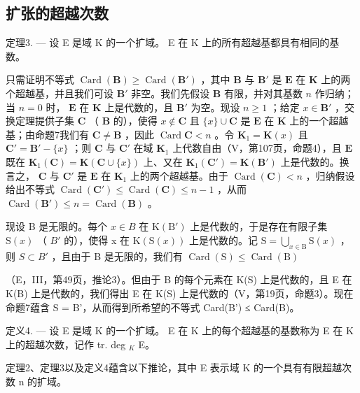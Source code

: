 \subsection{扩张的超越次数}

定理3. --- 设 E 是域 K 的一个扩域。 E 在 K 上的所有超越基都具有相同的基数。

只需证明不等式 \(\operatorname{Card}(\mathbf{B}) \geqslant \operatorname{Card}(\mathbf{B}')\) ，其中 \(\mathbf{B}\) 与 \(\mathbf{B}'\) 是 \(\mathbf{E}\) 在 \(\mathbf{K}\) 上的两个超越基，并且我们可设 \(\mathbf{B}'\) 非空。我们先假设 \(\mathbf{B}\) 有限，并对其基数 \(n\) 作归纳；当 \(n = 0\) 时， \(\mathbf{E}\) 在 \(\mathbf{K}\) 上是代数的，且 \(\mathbf{B}'\) 为空。现设 \(n \geqslant 1\) ；给定 \(x \in \mathbf{B}'\) ，交换定理提供子集 \(\mathbf{C}\) （ \(\mathbf{B}\) 的），使得 \(x \notin \mathbf{C}\) 且 \(\{x\} \cup \mathbf{C}\) 是 \(\mathbf{E}\) 在 \(\mathbf{K}\) 上的一个超越基；由命题7我们有 \(\mathbf{C} \neq \mathbf{B}\) ，因此 \(\operatorname{Card} \mathbf{C} < n\) 。令 \(\mathbf{K}_1 = \mathbf{K}(x)\) 且 \(\mathbf{C}' = \mathbf{B}' - \{x\}\) ；则 \(\mathbf{C}\) 与 \(\mathbf{C}'\) 在域 \(\mathbf{K}_1\) 上代数自由（V，第107页，命题4），且 \(\mathbf{E}\) 既在 \(\mathbf{K}_1(\mathbf{C}) = \mathbf{K}(\mathbf{C} \cup \{x\})\) 上、又在 \(\mathbf{K}_1(\mathbf{C}') = \mathbf{K}(\mathbf{B}')\) 上是代数的。换言之， \(\mathbf{C}\) 与 \(\mathbf{C}'\) 是 \(\mathbf{E}\) 在 \(\mathbf{K}_1\) 上的两个超越基。由于 \(\operatorname{Card}(\mathbf{C}) < n\) ，归纳假设给出不等式 \(\operatorname{Card}(\mathbf{C}') \leqslant \operatorname{Card}(\mathbf{C}) \leqslant n - 1\) ，从而 \(\operatorname{Card}(\mathbf{B}') \leqslant n = \operatorname{Card}(\mathbf{B})\) 。

现设 B 是无限的。每个 \(x \in B\) 在 \(\mathrm{K}(\mathrm{B}')\) 上是代数的，于是存在有限子集 \(\mathrm{S}(x)\) （ \(B'\) 的），使得 x 在 \(\mathrm{K}(\mathrm{S}(x))\) 上是代数的。记 \(\mathrm{S} = \bigcup_{x \in \mathrm{B}} \mathrm{S}(x)\) ，则 \(S \subset B'\) ，且由于 B 是无限的，我们有 \(\operatorname{Card}(\mathrm{S}) \leqslant \operatorname{Card}(\mathrm{B})\)

（E，III，第49页，推论3）。但由于 B 的每个元素在 K(S) 上是代数的，且 E 在 K(B) 上是代数的，我们得出 E 在 K(S) 上是代数的（V，第19页，命题3）。现在命题7蕴含 S = B'，从而得到所希望的不等式 Card(B') ≤ Card(B)。

定义4. --- 设 E 是域 K 的一个扩域。 E 在 K 上的每个超越基的基数称为 E 在 K 上的超越次数，记作 tr. deg \(_{K}\) E。

定理2、定理3以及定义4蕴含以下推论，其中 E 表示域 K 的一个具有有限超越次数 n 的扩域。

